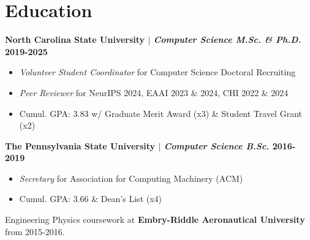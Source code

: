 \section{Education}
\vspace{-8pt}

\noindent\textbf{North Carolina State University $|$ {\normalfont\itshape Computer Science M.Sc. \& Ph.D.} \hfill 2019-2025}
\begin{itemize}
\setlength\itemsep{-0.5em}
    \item \textit{Volunteer Student Coordinator} for Computer Science Doctoral Recruiting
    \item \textit{Peer Reviewer} for NeurIPS 2024, EAAI 2023 \& 2024, CHI 2022 \& 2024
    \item Cumul. GPA: 3.83 w/ Graduate Merit Award (x3) \& Student Travel Grant (x2)
\end{itemize}

\vspace{-8pt}

\noindent\textbf{The Pennsylvania State University $|$ {\normalfont\itshape Computer Science B.Sc.} \hfill 2016-2019}
\begin{itemize}
    \setlength\itemsep{-0.5em}
    \item \textit{Secretary} for Association for Computing Machinery (ACM)
    \item Cumul. GPA: 3.66 \& Dean's List (x4)
\end{itemize}

\vspace{-6pt}
\noindent
Engineering Physics coursework at \textbf{Embry-Riddle Aeronautical University} from 2015-2016.
